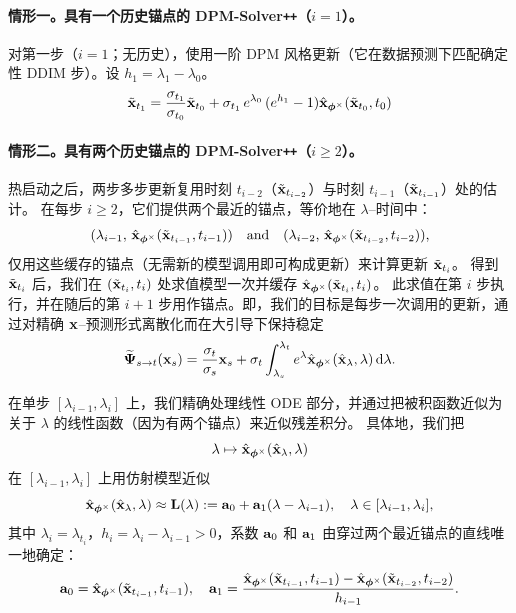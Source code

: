 \paragraph{情形一。具有一个历史锚点的 DPM-Solver\texttt{++}（$i= 1$）。}
对第一步（$i=1$；无历史），使用一阶 DPM 风格更新（它在数据预测下匹配确定性 DDIM 步）。设 $h_1=\lambda_1-\lambda_0$。
\[
\tilde{{\mathbf{x}}}_{t_1}
=
\frac{\sigma_{t_1}}{\sigma_{t_0}} \tilde{{\mathbf{x}}}_{t_0}
 + 
\sigma_{t_1}\,e^{\lambda_{0}}\,(e^{h_1}-1) 
\hat{{\mathbf{x}}}_{\bm{\phi}^\times}(\tilde{{\mathbf{x}}}_{t_0},t_0)
\]

\paragraph{情形二。具有两个历史锚点的 DPM-Solver\texttt{++}（$i\geq 2$）。} 



热启动之后，两步多步更新复用时刻 $t_{i-2}$（$\tilde{{\mathbf{x}}}_{t_{i-2}}$）与时刻 $t_{i-1}$（$\tilde{{\mathbf{x}}}_{t_{i-1}}$）处的估计。
在每步 $i\ge 2$，它们提供两个最近的锚点，等价地在 $\lambda$--时间中：
\[
(\lambda_{i-1},\,\hat{{\mathbf{x}}}_{\bm{\phi}^\times}(\tilde{{\mathbf{x}}}_{t_{i-1}},t_{i-1}))
\quad\text{and}\quad
(\lambda_{i-2},\,\hat{{\mathbf{x}}}_{\bm{\phi}^\times}(\tilde{{\mathbf{x}}}_{t_{i-2}},t_{i-2})),
\]
仅用这些缓存的锚点（无需新的模型调用即可构成更新）来计算更新 $\tilde{{\mathbf{x}}}_{t_i}$。
得到 $\tilde{{\mathbf{x}}}_{t_i}$ 后，我们在 $(\tilde{{\mathbf{x}}}_{t_i},t_i)$ 处求值模型一次并缓存
$\hat{{\mathbf{x}}}_{{\bm{\phi}}^\times}(\tilde{{\mathbf{x}}}_{t_i},t_i)$。
此求值在第 $i$ 步执行，并在随后的第 $i{+}1$ 步用作锚点。即，我们的目标是每步一次调用的更新，通过对精确 ${\mathbf{x}}$--预测形式离散化而在大引导下保持稳定
\begin{align*}
    \widetilde{{\bm{\Psi}}}_{s\to t}({\mathbf{x}}_s)
= \frac{\sigma_t}{\sigma_s} {\mathbf{x}}_s
 + 
\sigma_t \int_{\lambda_s}^{\lambda_t}  e^{\lambda} 
\hat{{\mathbf{x}}}_{\bm{\phi}^\times}(\hat{{\mathbf{x}}}_\lambda,\lambda) \mathop{}\!\mathrm{d}\lambda.
\end{align*}
 
在单步 $[\lambda_{i-1},\lambda_i]$ 上，我们精确处理线性 ODE 部分，并通过把被积函数近似为关于 $\lambda$ 的线性函数（因为有两个锚点）来近似残差积分。
具体地，我们把
\[
\lambda  \mapsto  \hat{{\mathbf{x}}}_{\bm{\phi}^\times}(\hat{{\mathbf{x}}}_{\lambda},\lambda)
\]
在 $[\lambda_{i-1},\lambda_i]$ 上用仿射模型近似
\[
\hat{{\mathbf{x}}}_{\bm{\phi}^\times}(\hat{{\mathbf{x}}}_{\lambda},\lambda) 
 \approx  {\mathbf{L}}(\lambda):={\mathbf{a}}_0+{\mathbf{a}}_1(\lambda-\lambda_{i-1}), 
\quad \lambda \in [\lambda_{i-1},\lambda_i],
\]
其中 $\lambda_i=\lambda_{t_i}$，$h_i=\lambda_i-\lambda_{i-1}>0$，系数 ${\mathbf{a}}_0$ 和 ${\mathbf{a}}_1$ 由穿过两个最近锚点的直线唯一地确定：
\[
{\mathbf{a}}_0=\hat{{\mathbf{x}}}_{\bm{\phi}^\times}(\tilde{{\mathbf{x}}}_{t_{i-1}},t_{i-1}), 
\quad
{\mathbf{a}}_1=\frac{\hat{{\mathbf{x}}}_{\bm{\phi}^\times}(\tilde{{\mathbf{x}}}_{t_{i-1}},t_{i-1})-\hat{{\mathbf{x}}}_{\bm{\phi}^\times}(\tilde{{\mathbf{x}}}_{t_{i-2}},t_{i-2})}{h_{i-1}}.
\]


